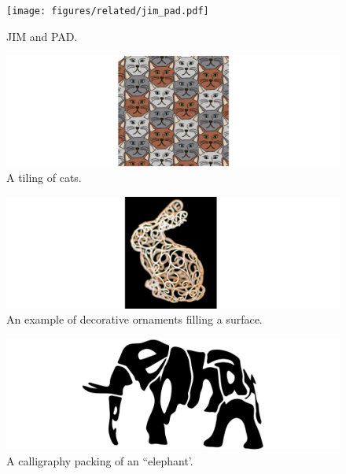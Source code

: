 \begin{figure}[t]
\centering
\texttt{[image: figures/related/jim\_pad.pdf]} 
\caption[Examples of packings generated by JIM and PAD]
{\label{fig_related_jim_pad} 
JIM and PAD. }
\end{figure}

\begin{figure}[t]
\centering
\includegraphics[width=1.0\textwidth]{figures/related/escherization.pdf} 
\caption[An example of a tiling]
{\label{fig_related_escherization} 
A tiling of cats. }
\end{figure}

\begin{figure}[t]
\centering
\includegraphics[width=1.0\textwidth]{figures/related/zehnder.pdf} 
\caption[An example of decorative ornaments filling a surface]
{\label{fig_related_zehnder} 
An example of decorative ornaments filling a surface.}
\end{figure}

\begin{figure}[t!]
\centering
\includegraphics[width=1.0\textwidth]{figures/related/calligraphy.pdf} 
\caption[A calligraphy packing of an ``elephant'']
{\label{fig_calligraphy} 
A calligraphy packing of an ``elephant'.}
\end{figure}



